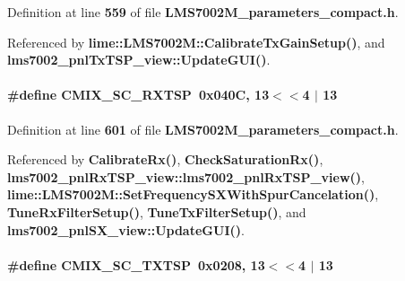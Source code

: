 Definition at line {\bf 559} of file {\bf L\+M\+S7002\+M\+\_\+parameters\+\_\+compact.\+h}.



Referenced by {\bf lime\+::\+L\+M\+S7002\+M\+::\+Calibrate\+Tx\+Gain\+Setup()}, and {\bf lms7002\+\_\+pnl\+Tx\+T\+S\+P\+\_\+view\+::\+Update\+G\+U\+I()}.

\paragraph[{C\+M\+I\+X\+\_\+\+S\+C\+\_\+\+R\+X\+T\+SP}]{\setlength{\rightskip}{0pt plus 5cm}\#define C\+M\+I\+X\+\_\+\+S\+C\+\_\+\+R\+X\+T\+SP~0x040\+C, 13$<$$<$4 $\vert$  13}\label{LMS7002M__parameters__compact_8h_aa2b5241ac69fb0bd0229c3340a193778}


Definition at line {\bf 601} of file {\bf L\+M\+S7002\+M\+\_\+parameters\+\_\+compact.\+h}.



Referenced by {\bf Calibrate\+Rx()}, {\bf Check\+Saturation\+Rx()}, {\bf lms7002\+\_\+pnl\+Rx\+T\+S\+P\+\_\+view\+::lms7002\+\_\+pnl\+Rx\+T\+S\+P\+\_\+view()}, {\bf lime\+::\+L\+M\+S7002\+M\+::\+Set\+Frequency\+S\+X\+With\+Spur\+Cancelation()}, {\bf Tune\+Rx\+Filter\+Setup()}, {\bf Tune\+Tx\+Filter\+Setup()}, and {\bf lms7002\+\_\+pnl\+S\+X\+\_\+view\+::\+Update\+G\+U\+I()}.

\paragraph[{C\+M\+I\+X\+\_\+\+S\+C\+\_\+\+T\+X\+T\+SP}]{\setlength{\rightskip}{0pt plus 5cm}\#define C\+M\+I\+X\+\_\+\+S\+C\+\_\+\+T\+X\+T\+SP~0x0208, 13$<$$<$4 $\vert$  13}\label{LMS7002M__parameters__compact_8h_ab2123f6edb0960a0fe21fb739e7897ea}



